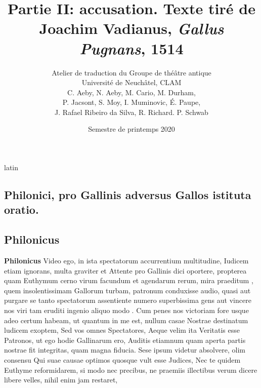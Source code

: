 \documentclass[12pt]{book}
\renewenvironment{latin}
    	{\begin{hyphenrules}{latin}}
    	{\end{hyphenrules}}
\begin{document}
        \title{Partie II: accusation. Texte tiré de Joachim Vadianus, \textit{Gallus Pugnans}, 1514}
        \author{Atelier de traduction du Groupe de théâtre antique\\
            Université de Neuchâtel, CLAM\\
            C. Aeby, N. Aeby, M. Cario, M. Durham,\\ 
            P. Jacsont, S. Moy, I. Muminovic, É. Paupe,\\
            J. Rafael Ribeiro da Silva, R. Richard. P. Schwab}
        \date{Semestre de printemps 2020}
        
        \maketitle
        \begin{pages}
        \begin{latin}
        \begin{Leftside}
        \beginnumbering 
            \pstart\section*{Philonici, pro Gallinis adversus Gallos istituta oratio.}\pend\pstart\subsection*{Philonicus}\pend\pstart\textbf{Philonicus}\hspace{1cm} 
                    Video ego, in ista spectatorum accurrentium multitudine, Iudicem etiam ignorans, multa graviter et Attente pro Gallinis dici oportere, 
                    propterea quam Euthymum cerno virum facundum et agendarum rerum, mira praeditum , 
                    quem insolentissimam Gallorum turbam, patronum conduxisse audio, quasi aut purgare se tanto spectatorum assentiente numero superbissima gens aut vincere nos viri tam eruditi ingenio aliquo modo . 
                    Cum penes nos victoriam fore usque adeo certum habeam, ut quantum in me est, nullum casae Nostrae destinatum ludicem exoptem, 
                    Sed vos omnes Spectatores, Aeque velim ita Veritatis esse Patronos, ut ego hodie Gallinarum ero, Auditis etiamnum quam aperta partis nostrae fit integritas, 
                    quam magna fiducia. Sese ipsum videtur absolvere, olim consensu Qui suae causae optimos quosque vult esse Judices, 
                    Nec te quidem Euthyme reformidarem, si modo nec precibus, ne praemiis illectibus verum dicere libere velles, nihil enim jam restaret, 

\end{Leftside}
\end{latin}
\end{pages}
\end{document}

